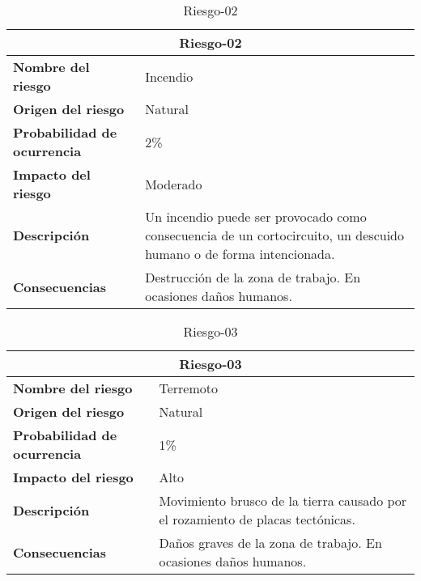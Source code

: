 \begin{table}[H]
\begin{center}
\begin{tabular}{p{} p{7cm}}
\multicolumn{2}{c}{\textbf{Riesgo-02} } \\
\hline \hline
\textbf{Nombre del riesgo} &  Incendio\\
\hline
\textbf{Origen del riesgo} & Natural\\
\hline
\textbf{Probabilidad de ocurrencia} &  2\% \\
\hline
\textbf{Impacto del riesgo} &  Moderado \\
\hline
\textbf{Descripción} & Un incendio puede ser provocado como consecuencia de un cortocircuito, un descuido humano o de forma intencionada.  \\
\hline
\textbf{Consecuencias} & Destrucción de la zona de trabajo. En ocasiones daños humanos.  \\
\hline
\end{tabular}
\caption{Riesgo-02}
\label{tab:Riesgo-02}
\end{center}
\end{table}

\begin{table}[H]
\begin{center}
\begin{tabular}{p{} p{7cm}}
\multicolumn{2}{c}{\textbf{Riesgo-03} } \\
\hline \hline
\textbf{Nombre del riesgo} & Terremoto \\
\hline
\textbf{Origen del riesgo} & Natural\\
\hline
\textbf{Probabilidad de ocurrencia} &1\%\\
\hline
\textbf{Impacto del riesgo} & Alto  \\
\hline
\textbf{Descripción} & Movimiento brusco de la tierra causado por el rozamiento de placas tectónicas.\\
\hline
\textbf{Consecuencias} & Daños graves de la zona de trabajo. En ocasiones daños humanos.  \\
\hline
\end{tabular}
\caption{Riesgo-03}
\label{tab:Riesgo-03}
\end{center}
\end{table}

